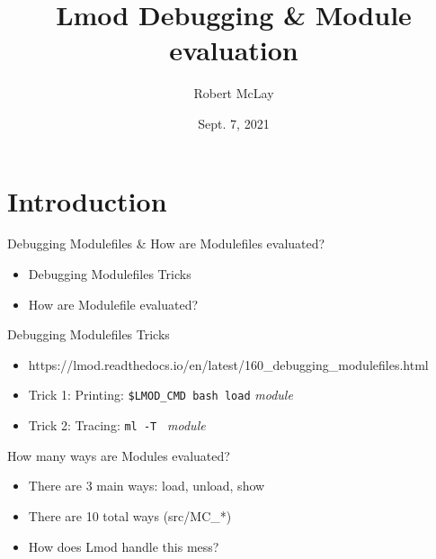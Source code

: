 \documentclass{beamer}
\begin{document}
\title[Lmod]{Lmod Debugging \& Module evaluation}
\author{Robert McLay} 
\date{Sept. 7, 2021}

\frame{\titlepage} 

\section{Introduction}

\begin{frame}{Debugging Modulefiles \& How are Modulefiles evaluated? }
  \begin{itemize}
    \item Debugging Modulefiles Tricks
    \item How are Modulefile evaluated?
  \end{itemize}
\end{frame}

\begin{frame}{Debugging Modulefiles Tricks}
  \begin{itemize}
    \item https://lmod.readthedocs.io/en/latest/160\_debugging\_modulefiles.html
    \item Trick 1: Printing: \texttt{\$LMOD\_CMD bash load} \emph{module}
    \item Trick 2: Tracing:  \texttt{ml -T } \emph{module}
  \end{itemize}
\end{frame}

\begin{frame}{How many ways are Modules evaluated?}
  \begin{itemize}
    \item There are 3 main ways: load, unload, show
    \item There are 10 total ways (src/MC\_*)
    \item How does Lmod handle this mess?
  \end{itemize}
\end{frame}
\end{document}
